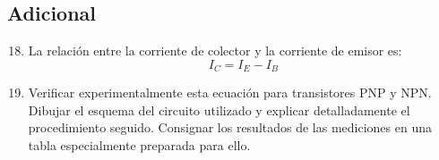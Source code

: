 \documentclass[a4paper,12pt]{article}
\begin{document}
\subsection{Adicional}
\begin{enumerate}
    \setcounter{enumi}{17}
    \item La relación entre la corriente de colector y la corriente de emisor es:
          \begin{equation}
              I_C = I_E - I_B
          \end{equation}
    \item Verificar experimentalmente esta ecuación para transistores PNP y NPN. Dibujar el esquema del
          circuito utilizado y explicar detalladamente el procedimiento seguido. Consignar los resultados de
          las mediciones en una tabla especialmente preparada para ello.
\end{enumerate}
\end{document}
